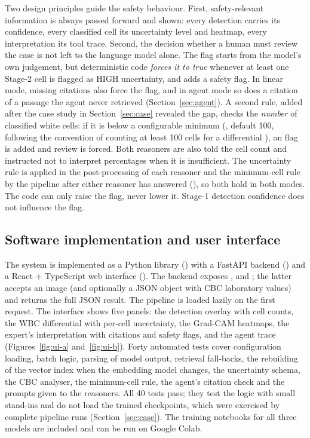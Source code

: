 Two design principles guide the safety behaviour. First, safety-relevant information is always passed forward and shown: every detection carries its confidence, every classified cell its uncertainty level and heatmap, every interpretation its tool trace. Second, the decision whether a human must review the case is not left to the language model alone. The flag  starts from the model's own judgement, but deterministic code \emph{forces it to true} whenever at least one Stage-2 cell is flagged as HIGH uncertainty, and adds a  safety flag. In linear mode, missing citations also force the flag, and in agent mode so does a citation of a passage the agent never retrieved (Section~\ref{sec:agent}). A second rule, added after the case study in Section~\ref{sec:case} revealed the gap, checks the \emph{number} of classified white cells: if it is below a configurable minimum (, default 100, following the convention of counting at least 100 cells for a differential \cite{clsi2007h20}), an  flag is added and review is forced. Both reasoners are also told the cell count and instructed not to interpret percentages when it is insufficient. The uncertainty rule is applied in the post-processing of each reasoner and the minimum-cell rule by the pipeline after either reasoner has answered (), so both hold in both modes. The code can only raise the flag, never lower it. Stage-1 detection confidence does not influence the flag.

\subsection{Software implementation and user interface}\label{sec:software}

The system is implemented as a Python library () with a FastAPI backend () and a React + TypeScript web interface (). The backend exposes ,  and ; the latter accepts an image (and optionally a JSON object with CBC laboratory values) and returns the full JSON result. The pipeline is loaded lazily on the first request. The interface shows five panels: the detection overlay with cell counts, the WBC differential with per-cell uncertainty, the Grad-CAM heatmaps, the expert's interpretation with citations and safety flags, and the agent trace (Figures~\ref{fig:ui-a} and~\ref{fig:ui-b}). Forty automated  tests cover configuration loading, batch logic, parsing of model output, retrieval fall-backs, the rebuilding of the vector index when the embedding model changes, the uncertainty schema, the CBC analyser, the minimum-cell rule, the agent's citation check and the prompts given to the reasoners. All 40 tests pass; they test the logic with small stand-ins and do not load the trained checkpoints, which were exercised by complete pipeline runs (Section~\ref{sec:case}). The training notebooks for all three models are included and can be run on Google Colab.

